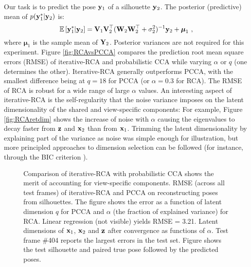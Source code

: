         Our task is to predict the pose $\mathbf{y}_1$ of a silhouette $\mathbf{y}_2$. The posterior (predictive) mean of $p(\mathbf{y}_1^*|\mathbf{y}_2)$ is:
        \[
          \mathbb{E}\left[\mathbf{y}_1^* | \mathbf{y}_2\right] = \mathbf{V}_1 \mathbf{V}_2^\top (\mathbf{W}_2 \mathbf{W}_2^\top + \sigma^2_2)^{-1} \mathbf{y}_2  + \boldsymbol{\mu}_1 ~,
        \]
        where $\boldsymbol{\mu}_1$ is the sample mean of $\mathbf{Y}_2$. Posterior variances are not required for this experiment.
        Figure \ref{fig:RCAvsPCCA} compares the prediction root mean square errors (RMSE) of iterative-RCA and probabilistic CCA while varying $\alpha$ or $q$ (one determines the other). Iterative-RCA generally outperforms PCCA, with the smallest difference being at $q = 18$ for PCCA (or $\alpha = 0.3$ for RCA). The RMSE of RCA is robust for a wide range of large $\alpha$ values. An interesting aspect of iterative-RCA is the self-regularity that the noise variance imposes on the latent dimensionality of the shared and view-specific components: For example, Figure \ref{fig:RCAretdim} shows the increase of noise with $\alpha$ causing the eigenvalues to decay faster from $\mathbf{z}$ and $\mathbf{x}_2$ than from $\mathbf{x}_1$. Trimming the latent dimensionality by explaining part of the variance as noise was simple enough for illustration, but more principled approaches to dimension selection can be followed (for instance, through the BIC criterion \citep{Schwarz:estimating78}).
        \begin{figure}[!htbp]
	  \vspace{0.5cm}
	  \caption[The merits of accounting for view-specific components.]{ Comparison of iterative-RCA with probabilistic CCA shows the merit of accounting for view-specific components. \textbf{} RMSE (across all test frames) of iterative-RCA and PCCA on reconstructing poses from silhouettes. The figure shows the error as a function of latent dimension $q$ for PCCA and $\alpha$ (the fraction of explained variance) for RCA. Linear regression (not visible) yields RMSE = 3.21.   Latent dimensions of $\mathbf{x}_1$, $\mathbf{x}_2$ and $\mathbf{z}$ after convergence as functions of $\alpha$.  Test frame \#404 reports the largest errors in the test set. Figure shows the test silhouette and paired true pose followed by the predicted poses.}
        \end{figure}

